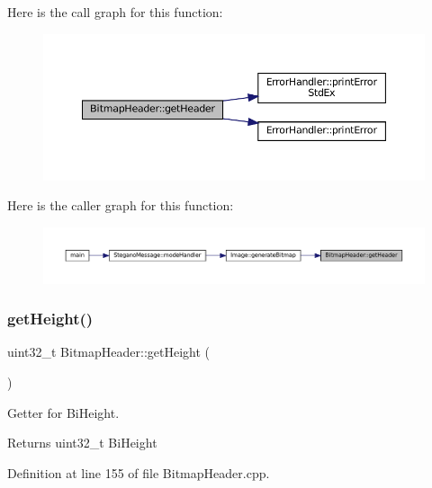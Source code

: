 Here is the call graph for this function\+:\nopagebreak
\begin{figure}[H]
\begin{center}
\leavevmode
\includegraphics[width=350pt]{classBitmapHeader_aa29e1acc8a7a588867039d7c0bdcde04_cgraph}
\end{center}
\end{figure}
Here is the caller graph for this function\+:\nopagebreak
\begin{figure}[H]
\begin{center}
\leavevmode
\includegraphics[width=350pt]{classBitmapHeader_aa29e1acc8a7a588867039d7c0bdcde04_icgraph}
\end{center}
\end{figure}
\mbox{\label{classBitmapHeader_a106f72d6c256327342029edf8e18bde1}} 
\subsubsection{\texorpdfstring{getHeight()}{getHeight()}}
{\footnotesize\ttfamily uint32\+\_\+t Bitmap\+Header\+::get\+Height (\begin{DoxyParamCaption}{ }\end{DoxyParamCaption})}



Getter for Bi\+Height. 

\begin{DoxyReturn}{Returns}
uint32\+\_\+t Bi\+Height 
\end{DoxyReturn}


Definition at line 155 of file Bitmap\+Header.\+cpp.

